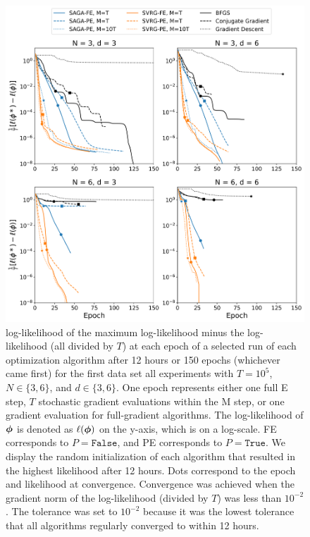 \begin{figure}[h]
    \centering
    \includegraphics[width=5in]{../plt/log-like_v_epoch_T-100000-000.png}
    \caption{log-likelihood of the maximum log-likelihood minus the log-likelihood (all divided by $T$) at each epoch of a selected run of each optimization algorithm after 12 hours or 150 epochs (whichever came first) for the first data set all experiments with $T=10^{5}$, $N \in \{3,6\}$, and $d \in \{3,6\}$. One epoch represents either one full E step, $T$ stochastic gradient evaluations within the M step, or one gradient evaluation for full-gradient algorithms. The log-likelihood of $\boldsymbol{\phi}$ is denoted as $\ell(\boldsymbol{\phi})$ on the y-axis, which is on a log-scale. FE corresponds to $P = \texttt{False}$, and PE corresponds to $P = \texttt{True}$. We display the random initialization of each algorithm that resulted in the highest likelihood after 12 hours. Dots correspond to the epoch and likelihood at convergence. Convergence was achieved when the gradient norm of the log-likelihood (divided by $T$) was less than $10^{-2}$. The tolerance was set to $10^{-2}$ because it was the lowest tolerance that all algorithms regularly converged to within 12 hours.}
    \label{fig:ll_trace_sim}
\end{figure}
%
